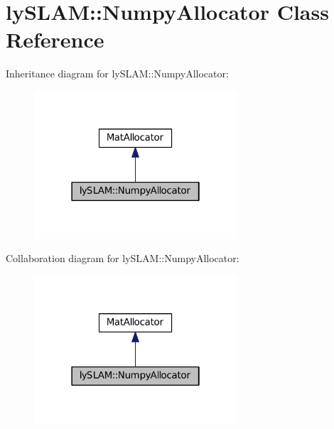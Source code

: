 \hypertarget{classlySLAM_1_1NumpyAllocator}{}\section{ly\+S\+L\+AM\+:\+:Numpy\+Allocator Class Reference}
\label{classlySLAM_1_1NumpyAllocator}


Inheritance diagram for ly\+S\+L\+AM\+:\+:Numpy\+Allocator\+:\nopagebreak
\begin{figure}[H]
\begin{center}
\leavevmode
\includegraphics[width=214pt]{classlySLAM_1_1NumpyAllocator__inherit__graph}
\end{center}
\end{figure}


Collaboration diagram for ly\+S\+L\+AM\+:\+:Numpy\+Allocator\+:\nopagebreak
\begin{figure}[H]
\begin{center}
\leavevmode
\includegraphics[width=214pt]{classlySLAM_1_1NumpyAllocator__coll__graph}
\end{center}
\end{figure}
